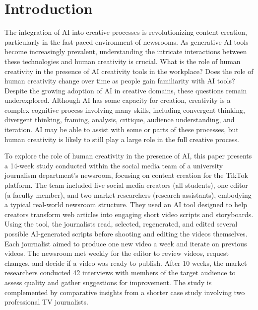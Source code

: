 \section{Introduction}

The integration of AI into creative processes is revolutionizing content creation, particularly in the fast-paced environment of newsrooms. 
As generative AI tools become increasingly prevalent, understanding the intricate interactions between these technologies and human creativity is crucial. 
What is the role of human creativity in the presence of AI creativity tools in the workplace? 
Does the role of human creativity change over time as people gain familiarity with AI tools?
Despite the growing adoption of AI in creative domains, these questions remain underexplored. 
Although AI has some capacity for creation, creativity is a complex cognitive process involving many skills, including convergent thinking, divergent thinking, framing, analysis, critique, audience understanding, and iteration. 
AI may be able to assist with some or parts of these processes, but human creativity is likely to still play a large role in the full creative process.

To explore the role of human creativity in the presence of AI, this paper presents a 14-week study conducted within the social media team of a university journalism department's newsroom, focusing on content creation for the TikTok platform. 
The team included five social media creators (all students), one editor (a faculty member), and two market researchers (research assistants), embodying a typical real-world newsroom structure.
They used an AI tool designed to help creators transform web articles into engaging short video scripts and storyboards. 
Using the tool, the journalists read, selected, regenerated, and edited several possible AI-generated scripts before shooting and editing the videos themselves. 
Each journalist aimed to produce one new video a week and iterate on previous videos. 
The newsroom met weekly for the editor to review videos, request changes, and decide if a video was ready to publish. 
After 10 weeks, the market researchers conducted 42 interviews with members of the target audience to assess quality  and gather suggestions for improvement. 
The study is complemented by comparative insights from a shorter case study involving two professional TV journalists.

